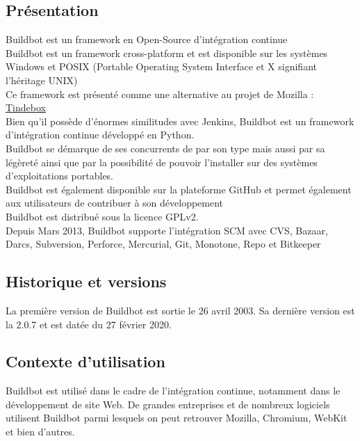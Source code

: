 \documentclass[12pt]{article}
\begin{document}
\subsection{Présentation}
Buildbot est un framework en Open-Source d'intégration continue
\\
Buildbot est un framework cross-platform et est disponible sur les systèmes Windows et POSIX (Portable Operating System Interface et X signifiant l'héritage UNIX)
\\
Ce framework est présenté comme une alternative au projet de Mozilla : \underline{Tindebox}
\\
Bien qu'il possède d'énormes similitudes avec Jenkins, Buildbot est un framework d'intégration continue développé en Python.
\\
Buildbot se démarque de ses concurrents de par son type mais aussi par sa légèreté ainsi que par la possibilité de pouvoir l'installer sur des systèmes d'exploitations portables.
\\
Buildbot est également disponible sur la plateforme GitHub et permet également aux utilisateurs de contribuer à son développement
\\
Buildbot est distribué sous la licence GPLv2.
\\
Depuis Mars 2013, Buildbot supporte l'intégration SCM avec CVS, Bazaar, Darcs, Subversion, Perforce, Mercurial, Git, Monotone, Repo et Bitkeeper

\subsection{Historique et versions}
La première version de Buildbot est sortie le 26 avril 2003. Sa dernière version est la 2.0.7 et est datée du 27 février 2020.

\subsection{Contexte d'utilisation}
Buildbot est utilisé dans le cadre de l'intégration continue, notamment dans le développement de site Web. De grandes entreprises et de nombreux logiciels utilisent Buildbot parmi lesquels on peut retrouver Mozilla, Chromium, WebKit et bien d'autres.
\end{document}
